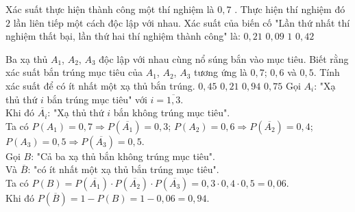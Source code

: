 \begin{ex} %
	Xác suất thực hiện thành công một thí nghiệm là $0,7$ . Thực hiện thí nghiệm đó $2$ lần liên tiếp một cách độc lập với nhau. Xác suất của biến cố "Lần thứ nhất thí nghiệm thất bại, lần thứ hai thí nghiệm thành công" là:
	\choice
	{\True $0,21$}
	{$0,09$}
	{$1$}
	{$0,42$}
\end{ex}

\begin{ex} %
	Ba xạ thủ ${{A}_{1}}$, ${{A}_{2}}$, ${{A}_{3}}$ độc lập với nhau cùng nổ súng bắn vào mục tiêu. Biết rằng xác suất bắn trúng mục tiêu của ${{A}_{1}}$, ${{A}_{2}}$, ${{A}_{3}}$ tương ứng là $0,7$; $0,6$ và $0,5$. Tính xác suất để có ít nhất một xạ thủ bắn trúng.
	\choice
	{ $0,45$}
	{ $0,21$}
	{ \True $0,94$}
	{ $0,75$}
	\loigiai
	{
		Gọi $A_i$: "Xạ thủ thứ $i$ bắn trúng mục tiêu" với $i=\overline{1,3}$.\\
		Khi đó $\overline{A_i}$: "Xạ thủ thứ $i$ bắn không trúng mục tiêu".\\
		Ta có $P(A_1)=0,7 \Rightarrow P(\overline{A_1})=0,3$; $P(A_2)=0,6 \Rightarrow P(\overline{A_2})=0,4$; $P(A_3)=0,5\Rightarrow P(\overline{A_3})=0,5$.\\
		Gọi $B$: "Cả ba xạ thủ bắn không trúng mục tiêu".\\
		Và $\overline{B}$: "có ít nhất một xạ thủ bắn trúng mục tiêu".\\
		Ta có $P(B)=P(\overline{A_1})\cdot P( \overline{A_2})\cdot P(\overline{A_3})=0,3\cdot 0,4\cdot 0,5=0,06$.\\
		Khi đó $P(\overline{B})=1-P(B)=1-0,06=0,94$.
	}
\end{ex}

